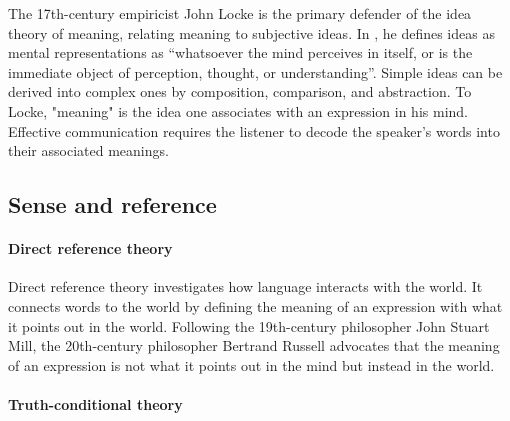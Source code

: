 The 17th-century empiricist John Locke is the primary defender of the idea theory of meaning, relating meaning to subjective ideas. In \textcite{locke_47}, he defines ideas as mental representations as ``whatsoever the mind perceives in itself, or is the immediate object of perception, thought, or understanding''. Simple ideas can be derived into complex ones by composition, comparison, and abstraction. To Locke, "meaning" is the idea one associates with an expression in his mind. Effective communication requires the listener to decode the speaker's words into their associated meanings.

\subsection{Sense and reference}

\paragraph{Direct reference theory} Direct reference theory investigates how language interacts with the world. It connects words to the world by defining the meaning of an expression with what it points out in the world. Following the 19th-century philosopher John Stuart Mill, the 20th-century philosopher Bertrand Russell advocates that the meaning of an expression is not what it points out in the mind but instead in the world.

\paragraph{Truth-conditional theory}

